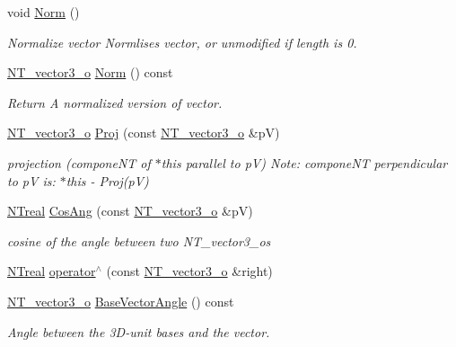 \begin{DoxyCompactItemize}
void \hyperlink{class_n_t__vector3__o_a048c872ca0984072827c8574358530c8}{Norm} ()
\begin{DoxyCompactList}\small\item\em Normalize vector Normlises vector, or unmodified if length is 0. \item\end{DoxyCompactList}\item 
\hyperlink{class_n_t__vector3__o}{NT\_\-vector3\_\-o} \hyperlink{class_n_t__vector3__o_a4532006ce89f904c6e91e73e7c10b6e4}{Norm} () const 
\begin{DoxyCompactList}\small\item\em Return A normalized version of vector. \item\end{DoxyCompactList}\item 
\hyperlink{class_n_t__vector3__o}{NT\_\-vector3\_\-o} \hyperlink{class_n_t__vector3__o_ac2bf3f66dc6e4eb7a188ae0f92c54de5}{Proj} (const \hyperlink{class_n_t__vector3__o}{NT\_\-vector3\_\-o} \&pV)
\begin{DoxyCompactList}\small\item\em projection (componeNT of $\ast$this parallel to pV) Note: componeNT perpendicular to pV is: $\ast$this -\/ Proj(pV) \item\end{DoxyCompactList}\item 
\hyperlink{nt__types_8h_a814a97893e9deb1eedcc7604529ba80d}{NTreal} \hyperlink{class_n_t__vector3__o_a8d24e3e67aa148cb6180d9088398e437}{CosAng} (const \hyperlink{class_n_t__vector3__o}{NT\_\-vector3\_\-o} \&pV)
\begin{DoxyCompactList}\small\item\em cosine of the angle between two NT\_\-vector3\_\-os \item\end{DoxyCompactList}\item 
\hyperlink{nt__types_8h_a814a97893e9deb1eedcc7604529ba80d}{NTreal} \hyperlink{class_n_t__vector3__o_a93fc3e29ba0b6d97b96efccb3678bb62}{operator$^\wedge$} (const \hyperlink{class_n_t__vector3__o}{NT\_\-vector3\_\-o} \&right)
\item 
\hyperlink{class_n_t__vector3__o}{NT\_\-vector3\_\-o} \hyperlink{class_n_t__vector3__o_ab9e5316360b64f6e0a3e6632be7d47f3}{BaseVectorAngle} () const 
\begin{DoxyCompactList}\small\item\em Angle between the 3D-\/unit bases and the vector. \item\end{DoxyCompactList}\item 

\end{DoxyCompactItemize}
